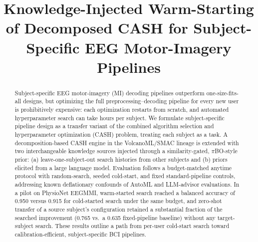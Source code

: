 \documentclass[conference]{IEEEtran}
\begin{document}

\title{Knowledge-Injected Warm-Starting of Decomposed CASH for Subject-Specific EEG Motor-Imagery Pipelines}

\author{
\and
{}
}

\maketitle

\begin{abstract}
Subject-specific EEG motor-imagery (MI) decoding pipelines outperform one-size-fits-all designs, but optimizing the full preprocessing--decoding pipeline for every new user is prohibitively expensive: each optimization restarts from scratch, and automated hyperparameter search can take hours per subject. We formulate subject-specific pipeline design as a transfer variant of the combined algorithm selection and hyperparameter optimization (CASH) problem, treating each subject as a task. A decomposition-based CASH engine in the VolcanoML/SMAC lineage is extended with two interchangeable knowledge sources injected through a similarity-gated, $\pi$BO-style prior: (a) leave-one-subject-out search histories from other subjects and (b) priors elicited from a large language model. Evaluation follows a budget-matched anytime protocol with random-search, seeded cold-start, and fixed standard-pipeline controls, addressing known deflationary confounds of AutoML and LLM-advisor evaluations. In a pilot on PhysioNet EEGMMI, warm-started search reached a balanced accuracy of 0.950 versus 0.915 for cold-started search under the same budget, and zero-shot transfer of a source subject's configuration retained a substantial fraction of the searched improvement (0.765 vs.\ a 0.635 fixed-pipeline baseline) without any target-subject search. These results outline a path from per-user cold-start search toward calibration-efficient, subject-specific BCI pipelines.
\end{abstract}
\end{document}
